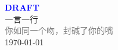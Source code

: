 \vspace*{\fill}
\begin{center}
    \textcolor{blue}{\Huge\textbf{DRAFT}} \\[1em]
    \textcolor{blue!60!black}{\Large 一言一行} \\[2em]
    \textcolor{gray}{\large 你如同一个吻，封碱了你的嘴} \\[1em]
    \today
\end{center}
\vspace*{\fill}
\clearpage


\clearpage

\clearpage

\clearpage


